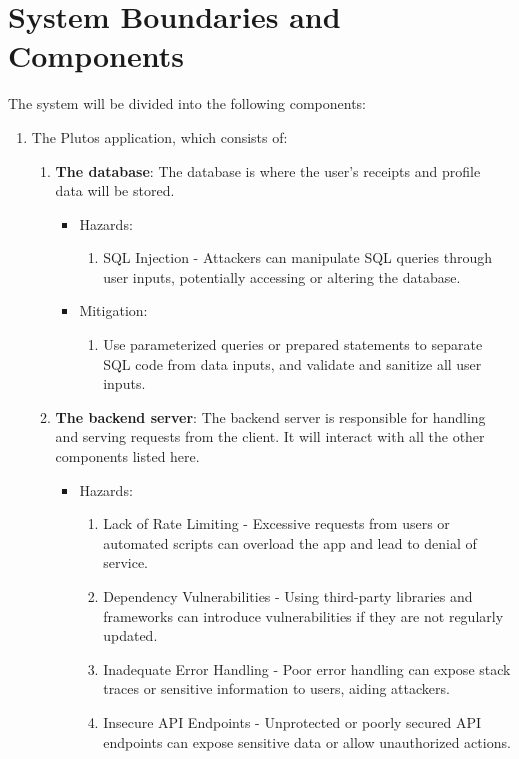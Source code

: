 \documentclass{article}
\begin{document}
\section{System Boundaries and Components}

The system will be divided into the following components:
\begin{enumerate}
    \item The Plutos application, which consists of:
    \begin{enumerate}
        \item \textbf{The database}: The database is where the user's receipts
        and profile data will be stored.
		\begin{itemize}
			\item Hazards:
				\begin{enumerate}
					\item SQL Injection - Attackers can manipulate SQL queries through user inputs, potentially accessing or altering the database.
				\end{enumerate}
			\item Mitigation:
				\begin{enumerate}
					\item Use parameterized queries or prepared statements to separate SQL code from data inputs, and validate and sanitize all user inputs.
				\end{enumerate}
		\end{itemize}
        \item \textbf{The backend server}: The backend server is responsible for
        handling and serving requests from the client. It will interact with all
        the other components listed here.
		\begin{itemize}
			\item Hazards:
				\begin{enumerate}
					\item Lack of Rate Limiting - Excessive requests from users or automated scripts can overload the app and lead to denial of service.
					\item Dependency Vulnerabilities - Using third-party libraries and frameworks can introduce vulnerabilities if they are not regularly updated.
					\item Inadequate Error Handling - Poor error handling can expose stack traces or sensitive information to users, aiding attackers.
					\item Insecure API Endpoints - Unprotected or poorly secured API endpoints can expose sensitive data or allow unauthorized actions.

\end{enumerate}
\end{itemize}
\end{enumerate}
\end{enumerate}
\end{document}
